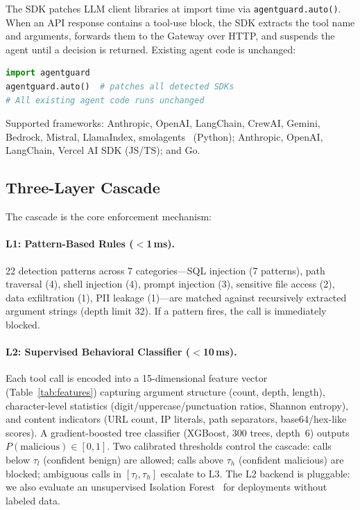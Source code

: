 \documentclass[11pt]{article}
\begin{document}
The SDK patches LLM client libraries at import time via \texttt{agentguard.auto()}.
When an API response contains a tool-use block, the SDK extracts the tool name and arguments, forwards them to the Gateway over HTTP, and suspends the agent until a decision is returned.
Existing agent code is unchanged:

\begin{lstlisting}[language=Python]
import agentguard
agentguard.auto()  # patches all detected SDKs
# All existing agent code runs unchanged
\end{lstlisting}

\noindent Supported frameworks: Anthropic, OpenAI, LangChain, CrewAI, Gemini, Bedrock, Mistral, LlamaIndex, smolagents~\cite{smolagents2024} (Python); Anthropic, OpenAI, LangChain, Vercel AI SDK (JS/TS); and Go.

\subsection{Three-Layer Cascade}
\label{sec:cascade}

The cascade is the core enforcement mechanism:

\paragraph{L1: Pattern-Based Rules ($<$1\,ms).}
22 detection patterns across 7 categories---SQL injection (7 patterns), path traversal (4), shell injection (4), prompt injection (3), sensitive file access (2), data exfiltration (1), PII leakage (1)---are matched against recursively extracted argument strings (depth limit 32). If a pattern fires, the call is immediately blocked.

\paragraph{L2: Supervised Behavioral Classifier ($<$10\,ms).}
Each tool call is encoded into a 15-dimensional feature vector (Table~\ref{tab:features}) capturing argument structure (count, depth, length), character-level statistics (digit/uppercase/punctuation ratios, Shannon entropy), and content indicators (URL count, IP literals, path separators, base64/hex-like scores).
A gradient-boosted tree classifier (XGBoost, 300 trees, depth~6) outputs $P(\text{malicious}) \in [0,1]$.
Two calibrated thresholds control the cascade: calls below $\tau_l$ (confident benign) are allowed; calls above $\tau_h$ (confident malicious) are blocked; ambiguous calls in $[\tau_l, \tau_h]$ escalate to L3.
The L2 backend is pluggable: we also evaluate an unsupervised Isolation Forest~\cite{zhao2019pyod} for deployments without labeled data.
\end{document}
